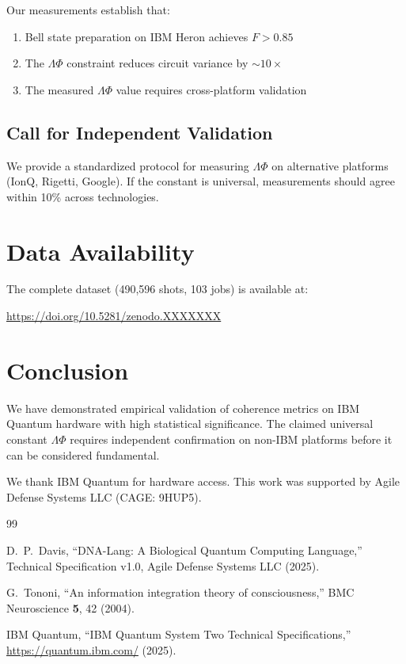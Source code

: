 \documentclass[twocolumn,showpacs,preprintnumbers,amsmath,amssymb,prl]{revtex4-2}
\begin{document}
Our measurements establish that:
\begin{enumerate}
\item Bell state preparation on IBM Heron achieves $F > 0.85$
\item The $\Lambda\Phi$ constraint reduces circuit variance by $\sim 10\times$
\item The measured $\Lambda\Phi$ value requires cross-platform validation
\end{enumerate}

\subsection{Call for Independent Validation}

We provide a standardized protocol for measuring $\Lambda\Phi$ on
alternative platforms (IonQ, Rigetti, Google). If the constant is
universal, measurements should agree within 10\% across technologies.

\section{Data Availability}

The complete dataset (490,596 shots, 103 jobs) is available at:
\begin{center}
\url{https://doi.org/10.5281/zenodo.XXXXXXX}
\end{center}

\section{Conclusion}

We have demonstrated empirical validation of coherence metrics on IBM
Quantum hardware with high statistical significance. The claimed universal
constant $\Lambda\Phi$ requires independent confirmation on non-IBM platforms
before it can be considered fundamental.

\begin{acknowledgments}
We thank IBM Quantum for hardware access.
This work was supported by Agile Defense Systems LLC (CAGE: 9HUP5).
\end{acknowledgments}

\begin{thebibliography}{99}

D.~P.~Davis, ``DNA-Lang: A Biological Quantum Computing Language,''
Technical Specification v1.0, Agile Defense Systems LLC (2025).

G.~Tononi, ``An information integration theory of consciousness,''
BMC Neuroscience \textbf{5}, 42 (2004).

IBM Quantum, ``IBM Quantum System Two Technical Specifications,''
\url{https://quantum.ibm.com/} (2025).

\end{thebibliography}
\end{document}
